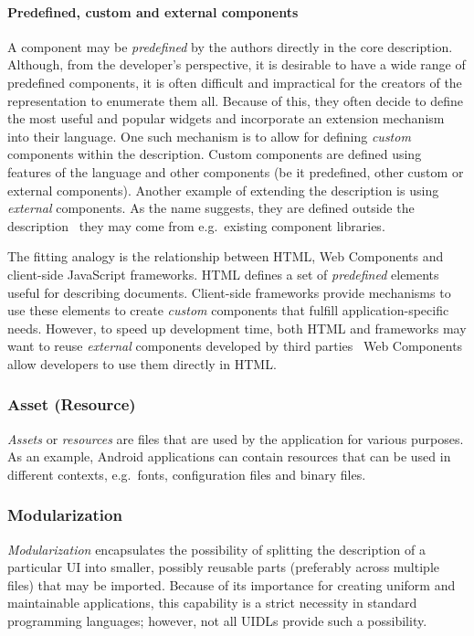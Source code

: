 \paragraph{Predefined, custom and external components}
A component may be \emph{predefined} by the authors directly in the core description.
Although, from the developer's perspective, it is desirable to have a wide range of predefined components, it is often difficult and impractical for the creators of the representation to enumerate them all.
Because of this, they often decide to define the most useful and popular widgets and incorporate an extension mechanism into their language.
One such mechanism is to allow for defining \emph{custom} components within the description.
Custom components are defined using features of the language and other components (be it predefined, other custom or external components).
Another example of extending the description is using \emph{external} components.
As the name suggests, they are defined outside the description \textendash\ they may come from e.g.\ existing component libraries.

The fitting analogy is the relationship between HTML, Web Components and client-side JavaScript frameworks.
HTML defines a set of \emph{predefined} elements useful for describing documents.
Client-side frameworks provide mechanisms to use these elements to create \emph{custom} components that fulfill application-specific needs.
However, to speed up development time, both HTML and frameworks may want to reuse \emph{external} components developed by third parties \textendash\ Web Components allow developers to use them directly in HTML\@.

\subsubsection{Asset (Resource)}
\emph{Assets} or \emph{resources} are files that are used by the application for various purposes.
As an example, Android applications can contain resources that can be used in different contexts, e.g.\ fonts, configuration files and binary files.

\subsubsection{Modularization}
\emph{Modularization} encapsulates the possibility of splitting the description of a particular UI into smaller, possibly reusable parts (preferably across multiple files) that may be imported.
Because of its importance for creating uniform and maintainable applications, this capability is a strict necessity in standard programming languages;
however, not all UIDLs provide such a possibility.

